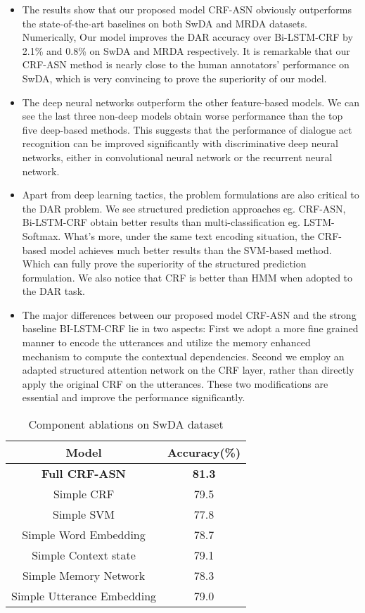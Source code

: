 \documentclass[sigconf]{acmart}
\begin{document}
\begin{itemize}
	\item The results show that our proposed model CRF-ASN obviously outperforms the state-of-the-art baselines on both SwDA and MRDA datasets. Numerically, Our model improves the DAR accuracy over Bi-LSTM-CRF by 2.1\% and 0.8\% on SwDA and MRDA respectively. It is remarkable that our CRF-ASN method is nearly close to the human annotators' performance on SwDA, which is very convincing to prove the superiority of our model.
	\item The deep neural networks outperform the other feature-based models. We can see the last three non-deep models obtain worse performance than the top five deep-based methods. This suggests that the performance of dialogue act recognition can be improved significantly with discriminative deep neural networks, either in convolutional neural network or the recurrent neural network.
	\item Apart from deep learning tactics, the problem formulations are also critical to the DAR problem. We see structured prediction approaches eg. CRF-ASN, Bi-LSTM-CRF obtain better results than multi-classification eg. LSTM-Softmax. What's more, under the same text encoding situation, the CRF-based model achieves much better results than the SVM-based method. Which can fully prove the superiority of the structured prediction formulation. We also notice that CRF is better than HMM when adopted to the DAR task.
	\item The major differences between our proposed model CRF-ASN and the strong baseline BI-LSTM-CRF lie in two aspects: First we adopt a more fine grained manner to encode the utterances and utilize the memory enhanced mechanism to compute the contextual dependencies. Second we employ an adapted structured attention network on the CRF layer, rather than directly apply the original CRF on the utterances. These two modifications are essential and improve the performance significantly.
\end{itemize}
\begin{table}[t]
	\center
	\small
	\begin{tabular}{| c | c |}
		\hline
		\textbf{Model} & \textbf{Accuracy(\%)} \\
		\hline
		\textbf{Full CRF-ASN} &\textbf{81.3} \\
		\hline
		Simple CRF & 79.5 \\
		Simple SVM &77.8 \\
		Simple Word Embedding &78.7\\
		Simple Context state &79.1\\
		Simple Memory Network &78.3\\
		Simple Utterance Embedding &79.0\\
		\hline
	\end{tabular}
	\caption{Component ablations on SwDA dataset}
\end{table}
\end{document}
